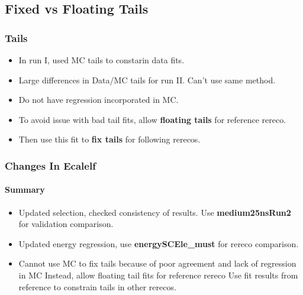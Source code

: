 \documentclass[8pt,serif]{beamer}
\begin{document}
\subsection{Fixed vs Floating Tails}
\begin{frame}
\frametitle{Tails}

\vspace{10mm}

\begin{itemize}
\item In run I, used MC tails to constarin data fits.
\item Large differences in Data/MC tails for run II. Can't use same method.
\item Do not have regression incorporated in MC.
\item To avoid issue with bad tail fits, allow \textbf{floating tails} for reference rereco.
\item Then use this fit to \textbf{fix tails} for following rerecos.
\end{itemize}
  
\end{frame}
\begin{frame}
\frametitle{Changes In Ecalelf}
\framesubtitle{Summary}

\vspace{10mm}

\begin{itemize}
\item Updated selection, checked consistency of results.
\subitem Use \textbf{medium25nsRun2} for validation comparison.
\item Updated energy regression, use \textbf{energySCEle\_must} for rereco comparison.
\item Cannot use MC to fix tails because of poor agreement and lack of regression in MC
\subitem Instead, allow floating tail fits for reference rereco
\subitem Use fit results from reference to constrain tails in other rerecos.
\end{itemize}
  
\end{frame}
\end{document}
